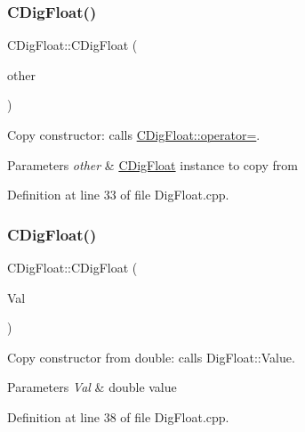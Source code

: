 \subsubsection{\texorpdfstring{C\+Dig\+Float()}{CDigFloat()}\hspace{0.1cm}{\footnotesize\ttfamily [2/3]}}
{\footnotesize\ttfamily C\+Dig\+Float\+::\+C\+Dig\+Float (\begin{DoxyParamCaption}\item[{const \hyperlink{classCDigFloat}{C\+Dig\+Float} \&}]{other }\end{DoxyParamCaption})}



Copy constructor\+: calls \hyperlink{classCDigFloat_a74f36566c2c79d7258b7b2dee35d46b2}{C\+Dig\+Float\+::operator=}. 


\begin{DoxyParams}{Parameters}
{\em other} & \hyperlink{classCDigFloat}{C\+Dig\+Float} instance to copy from \\
\hline
\end{DoxyParams}


Definition at line 33 of file Dig\+Float.\+cpp.

\mbox{\label{classCDigFloat_a0ae24452dfb7838ec97a3998cd2b8f36}} 
\subsubsection{\texorpdfstring{C\+Dig\+Float()}{CDigFloat()}\hspace{0.1cm}{\footnotesize\ttfamily [3/3]}}
{\footnotesize\ttfamily C\+Dig\+Float\+::\+C\+Dig\+Float (\begin{DoxyParamCaption}\item[{const double}]{Val }\end{DoxyParamCaption})}



Copy constructor from double\+: calls Dig\+Float\+::\+Value. 


\begin{DoxyParams}{Parameters}
{\em Val} & double value \\
\hline
\end{DoxyParams}


Definition at line 38 of file Dig\+Float.\+cpp.




